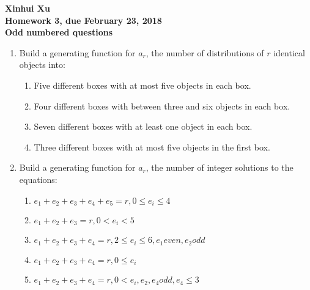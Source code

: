 \documentclass[12pt]{amsart}
\begin{document}
\begin{center}
  \bfseries
  Xinhui Xu\\
  Homework 3, due February 23, 2018\\
  Odd numbered questions
\end{center}

\bigskip

\begin{enumerate}
\item  Build a generating function for $a_r$, the number of distributions of $r$ identical
objects into:
    \begin{enumerate}
    \item Five different boxes with at most five objects in each box. \\
    \item Four different boxes with between three and six objects in each box.\\
    \item Seven different boxes with at least one object in each box.\\
    \item Three different boxes with at most five objects in the first box.\\
    \end{enumerate}
\item  Build a generating function for $a_r$, the number of integer solutions to the equations:
    \begin{enumerate}
        \item $e_1 + e_2 + e_3 + e_4 + e_5 = r, 0 \leq e_i \leq 4$\\
\item $e_1 + e_2 + e_3 = r, 0 < e_i < 5$\\
\item $e_1 + e_2 + e_3 + e_4 = r, 2 \leq e_i \leq 6, e_1 even, e_2 odd$\\
\item $e_1 + e_2 + e_3 + e_4 = r, 0 \leq e_i$\\
\item $e_1 + e_2 + e_3 + e_4 = r, 0 < e_i, e_2, e_4 odd, e_4 \leq 3$\\
    \end{enumerate}
    

\end{enumerate}
\end{document}
